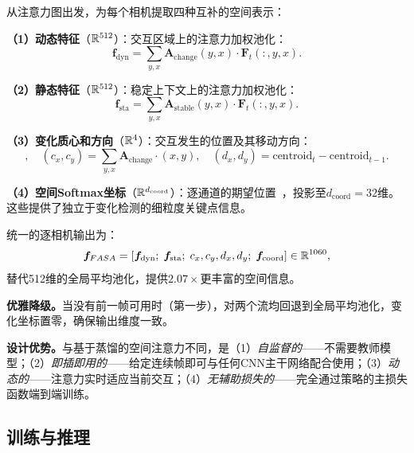 从注意力图出发，\fasa{}为每个相机提取四种互补的空间表示：

\textbf{（1）动态特征}（$\mathbb{R}^{512}$）：交互区域上的注意力加权池化：
\begin{equation}
    \bm{f}_{\text{dyn}} = \textstyle\sum_{y,x} \bm{A}_{\text{change}}(y,x) \cdot \bm{F}_t(:,y,x).
    \label{eq:dynamic_pool}
\end{equation}

\textbf{（2）静态特征}（$\mathbb{R}^{512}$）：稳定上下文上的注意力加权池化：
\begin{equation}
    \bm{f}_{\text{sta}} = \textstyle\sum_{y,x} \bm{A}_{\text{stable}}(y,x) \cdot \bm{F}_t(:,y,x).
    \label{eq:static_pool}
\end{equation}

\textbf{（3）变化质心和方向}（$\mathbb{R}^4$）：交互发生的位置及其移动方向：
\begin{equation}
    [c_x, c_y, d_x, d_y], \quad (c_x, c_y) = \textstyle\sum_{y,x} \bm{A}_{\text{change}} \cdot (x,y), \quad (d_x, d_y) = \text{centroid}_t - \text{centroid}_{t-1}.
    \label{eq:change_coords}
\end{equation}

\textbf{（4）空间Softmax坐标}（$\mathbb{R}^{d_{\text{coord}}}$）：逐通道的期望位置~\cite{levine2016end}，投影至$d_{\text{coord}} = 32$维。这些提供了独立于变化检测的细粒度关键点信息。

统一的逐相机输出为：
\begin{equation}
    \bm{f}_{FASA{}} = [\bm{f}_{\text{dyn}};\; \bm{f}_{\text{sta}};\; c_x, c_y, d_x, d_y;\; \bm{f}_{\text{coord}}] \in \mathbb{R}^{1060},
    \label{eq:fasa_output}
\end{equation}
替代512维的全局平均池化，提供$2.07\times$更丰富的空间信息。

\textbf{优雅降级。}当没有前一帧可用时（第一步），\fasa{}对两个流均回退到全局平均池化，变化坐标置零，确保输出维度一致。

\textbf{设计优势。}与基于蒸馏的空间注意力不同，\fasa{}是（1）\emph{自监督的}——不需要教师模型；（2）\emph{即插即用的}——给定连续帧即可与任何CNN主干网络配合使用；（3）\emph{动态的}——注意力实时适应当前交互；（4）\emph{无辅助损失的}——完全通过策略的主损失函数端到端训练。

\subsection{训练与推理}
\label{sec:training}

